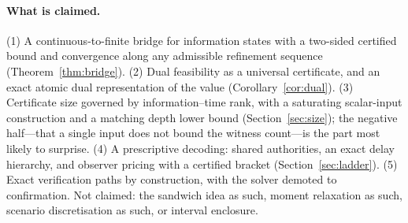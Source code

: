 \paragraph{What is claimed.}
(1) A continuous-to-finite bridge for information states with a two-sided certified bound and convergence along any admissible refinement sequence (Theorem~\ref{thm:bridge}). (2) Dual feasibility as a universal certificate, and an exact atomic dual representation of the value (Corollary~\ref{cor:dual}). (3) Certificate size governed by information--time rank, with a saturating scalar-input construction and a matching depth lower bound (Section~\ref{sec:size}); the negative half---that a single input does not bound the witness count---is the part most likely to surprise. (4) A prescriptive decoding: shared authorities, an exact delay hierarchy, and observer pricing with a certified bracket (Section~\ref{sec:ladder}). (5) Exact verification paths by construction, with the solver demoted to confirmation. Not claimed: the sandwich idea as such, moment relaxation as such, scenario discretisation as such, or interval enclosure.
